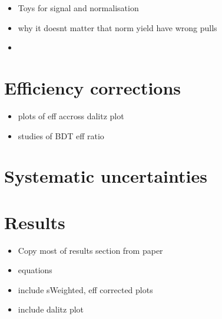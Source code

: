 {\color{Red}
\begin{itemize}
\item Toys for signal and normalisation
\item why it doesnt matter that norm yield have wrong pulls
\item 
\end{itemize}
}

\section{Efficiency corrections}
\label{sec:B2DsKK_effcorrection}

{\color{Red}
\begin{itemize}
\item plots of eff accross dalitz plot
\item studies of BDT eff ratio 
\end{itemize}
}


\section{Systematic uncertainties}
\label{sec:B2DsKK_systuncertainy}


\section{Results}
\label{sec:B2DsKK_results}



{\color{Red}
\begin{itemize}
\item Copy most of results section from paper
\item equations
\item include sWeighted, eff corrected plots
\item include dalitz plot
\end{itemize}
}
